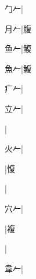 \begin{multicols}{2}
{{\cjk{}{\cnsym{}　}勹{\cnxHanaA{}𠂉}}|{}\par
{\cjk{}{\cnsym{}　}月{\cnxHanaA{}𠂉}}|{\cjk{}腹}\par
{\cjk{}{\cnsym{}　}鱼{\cnxHanaA{}𠂉}}|{\cjk{}鳆}\par
{\cjk{}{\cnsym{}　}魚{\cnxHanaA{}𠂉}}|{\cjk{}鰒}\par
{\cjk{}{\cnsym{}　}疒{\cnxHanaA{}𠂉}}|{}\par
{\cjk{}{\cnsym{}　}立{\cnxHanaA{}𠂉}}|{}\par
{}|{}\par
{\cjk{}{\cnsym{}　}火{\cnxHanaA{}𠂉}}|{}\par
{}|{\cjk{}愎}\par
{}|{}\par
{\cjk{}{\cnsym{}　}穴{\cnxHanaA{}𠂉}}|{}\par
{}|{\cjk{}複}\par
{}|{}\par
{\cjk{}{\cnsym{}　}韋{\cnxHanaA{}𠂉}}|{}\par
}
\end{multicols}
